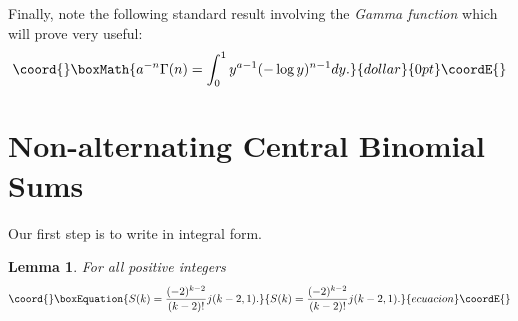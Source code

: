 \documentclass[a4paper,a4paper]{article}
\newtheorem{Lem}{Lemma}
\begin{document}
Finally, note the following standard result involving the {\em Gamma
function}
which will prove very useful:
$$\coord{}\boxMath{
a^{-n}\Gamma(n) = \int_0^1 y^{a-1} (-\log y)^{n-1} dy.
}{dollar}{0pt}\coordE{}$$

\section{Non-alternating Central Binomial Sums}

Our first step is to write \coordHE{} in integral form.
\begin{Lem} For all  positive integers
\begin{equation}\coord{}\boxEquation{
 S(k) = \frac{(-2)^{k-2}}{(k-2)!} j(k-2, 1).
}{
 S(k) = \frac{(-2)^{k-2}}{(k-2)!} j(k-2, 1).
}{ecuacion}\coordE{}\end{equation}
\end{Lem}
\end{document}
